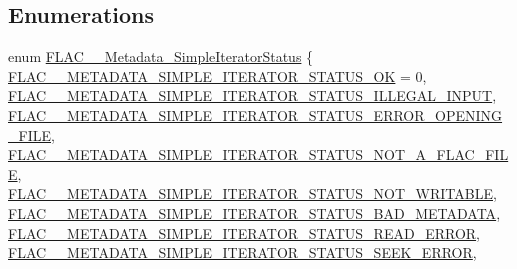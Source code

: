\subsection*{Enumerations}
\begin{DoxyCompactItemize}
\item 
enum \hyperlink{group__flac__metadata__level1_gac926e7d2773a05066115cac9048bbec9}{F\+L\+A\+C\+\_\+\+\_\+\+Metadata\+\_\+\+Simple\+Iterator\+Status} \{ \newline
\hyperlink{group__flac__metadata__level1_ggac926e7d2773a05066115cac9048bbec9a33aadd73194c0d7e307d643237e0ddcd}{F\+L\+A\+C\+\_\+\+\_\+\+M\+E\+T\+A\+D\+A\+T\+A\+\_\+\+S\+I\+M\+P\+L\+E\+\_\+\+I\+T\+E\+R\+A\+T\+O\+R\+\_\+\+S\+T\+A\+T\+U\+S\+\_\+\+OK} = 0, 
\hyperlink{group__flac__metadata__level1_ggac926e7d2773a05066115cac9048bbec9a0a3933cb38c8957a8d5c3d1afb4766f9}{F\+L\+A\+C\+\_\+\+\_\+\+M\+E\+T\+A\+D\+A\+T\+A\+\_\+\+S\+I\+M\+P\+L\+E\+\_\+\+I\+T\+E\+R\+A\+T\+O\+R\+\_\+\+S\+T\+A\+T\+U\+S\+\_\+\+I\+L\+L\+E\+G\+A\+L\+\_\+\+I\+N\+P\+UT}, 
\hyperlink{group__flac__metadata__level1_ggac926e7d2773a05066115cac9048bbec9a20e835bbb74b4d039e598617f68d2af6}{F\+L\+A\+C\+\_\+\+\_\+\+M\+E\+T\+A\+D\+A\+T\+A\+\_\+\+S\+I\+M\+P\+L\+E\+\_\+\+I\+T\+E\+R\+A\+T\+O\+R\+\_\+\+S\+T\+A\+T\+U\+S\+\_\+\+E\+R\+R\+O\+R\+\_\+\+O\+P\+E\+N\+I\+N\+G\+\_\+\+F\+I\+LE}, 
\hyperlink{group__flac__metadata__level1_ggac926e7d2773a05066115cac9048bbec9a7785f77a612be8956fbe7cab73497220}{F\+L\+A\+C\+\_\+\+\_\+\+M\+E\+T\+A\+D\+A\+T\+A\+\_\+\+S\+I\+M\+P\+L\+E\+\_\+\+I\+T\+E\+R\+A\+T\+O\+R\+\_\+\+S\+T\+A\+T\+U\+S\+\_\+\+N\+O\+T\+\_\+\+A\+\_\+\+F\+L\+A\+C\+\_\+\+F\+I\+LE}, 
\newline
\hyperlink{group__flac__metadata__level1_ggac926e7d2773a05066115cac9048bbec9af055d8c0c663e72134fe2db8037b6880}{F\+L\+A\+C\+\_\+\+\_\+\+M\+E\+T\+A\+D\+A\+T\+A\+\_\+\+S\+I\+M\+P\+L\+E\+\_\+\+I\+T\+E\+R\+A\+T\+O\+R\+\_\+\+S\+T\+A\+T\+U\+S\+\_\+\+N\+O\+T\+\_\+\+W\+R\+I\+T\+A\+B\+LE}, 
\hyperlink{group__flac__metadata__level1_ggac926e7d2773a05066115cac9048bbec9a14c897124887858109200723826f85b7}{F\+L\+A\+C\+\_\+\+\_\+\+M\+E\+T\+A\+D\+A\+T\+A\+\_\+\+S\+I\+M\+P\+L\+E\+\_\+\+I\+T\+E\+R\+A\+T\+O\+R\+\_\+\+S\+T\+A\+T\+U\+S\+\_\+\+B\+A\+D\+\_\+\+M\+E\+T\+A\+D\+A\+TA}, 
\hyperlink{group__flac__metadata__level1_ggac926e7d2773a05066115cac9048bbec9a088df964f0852dd7e19304e920c3ee8e}{F\+L\+A\+C\+\_\+\+\_\+\+M\+E\+T\+A\+D\+A\+T\+A\+\_\+\+S\+I\+M\+P\+L\+E\+\_\+\+I\+T\+E\+R\+A\+T\+O\+R\+\_\+\+S\+T\+A\+T\+U\+S\+\_\+\+R\+E\+A\+D\+\_\+\+E\+R\+R\+OR}, 
\hyperlink{group__flac__metadata__level1_ggac926e7d2773a05066115cac9048bbec9a2ad85a32e291d1e918692d68cc22fd40}{F\+L\+A\+C\+\_\+\+\_\+\+M\+E\+T\+A\+D\+A\+T\+A\+\_\+\+S\+I\+M\+P\+L\+E\+\_\+\+I\+T\+E\+R\+A\+T\+O\+R\+\_\+\+S\+T\+A\+T\+U\+S\+\_\+\+S\+E\+E\+K\+\_\+\+E\+R\+R\+OR}, 

\end{DoxyCompactItemize}
